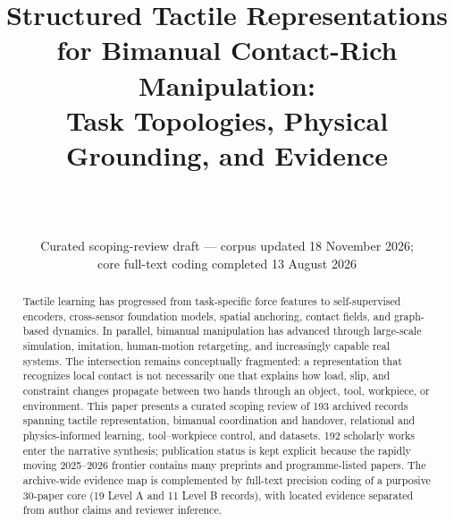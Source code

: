 \documentclass[10pt,a4paper]{article}
\title{\bfseries\color{reviewblue}Structured Tactile Representations for Bimanual Contact-Rich Manipulation:\\[2mm]
\large Task Topologies, Physical Grounding, and Evidence}
\author{\ProposalAuthor\\[-1mm]\small \DepartmentName\\\small \InstitutionName}
\date{Curated scoping-review draft --- corpus updated 18 November 2026;\\
core full-text coding completed 13 August 2026}
\begin{document}
\maketitle

\begin{abstract}
Tactile learning has progressed from task-specific force features to
self-supervised encoders, cross-sensor foundation models, spatial anchoring,
contact fields, and graph-based dynamics. In parallel, bimanual manipulation has
advanced through large-scale simulation, imitation, human-motion retargeting,
and increasingly capable real systems. The intersection remains conceptually
fragmented: a representation that recognizes local contact is not necessarily
one that explains how load, slip, and constraint changes propagate between two
hands through an object, tool, workpiece, or environment. This paper presents a
curated scoping review of 193 archived records spanning tactile representation,
bimanual coordination and handover, relational and physics-informed learning,
tool--workpiece control, and datasets. 192 scholarly works enter the
  narrative synthesis; publication status is kept explicit because the rapidly
  moving 2025--2026 frontier contains many preprints and programme-listed papers.
  The archive-wide evidence map is complemented by full-text precision coding of
  a purposive 30-paper core (19 Level A and 11 Level B records), with located
  evidence separated from author claims and reviewer inference.


\end{abstract}
\end{document}
